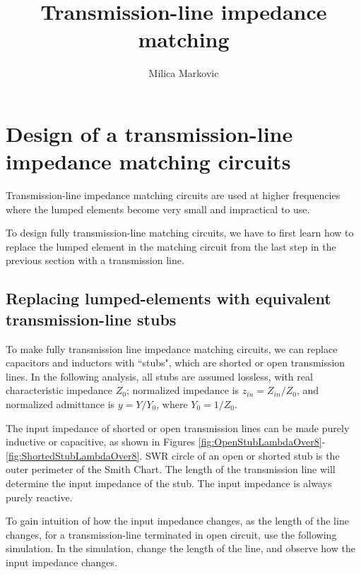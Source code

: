 \documentclass{ximera}
\title{Transmission-line impedance matching}
\author{Milica Markovic}
\begin{document}
  
\begin{abstract}  

\end{abstract}  
\maketitle    



\section{Design of a transmission-line impedance matching circuits}

Transmission-line impedance matching circuits are used at higher frequencies where the lumped elements become very small and impractical to use. 

To design fully transmission-line matching circuits, we have to first learn how to replace the lumped element in the matching circuit from the last step in the previous section with a transmission line. 

\subsection{Replacing lumped-elements with equivalent transmission-line stubs}

To make fully transmission line impedance matching circuits, we can replace capacitors and inductors with ``stubs", which are shorted or open transmission lines. In the following analysis, all stubs are assumed lossless, with real characteristic impedance $Z_0$; normalized impedance is $z_{in}=Z_{in}/Z_0$, and normalized admittance is $y=Y/Y_0$, where $Y_0=1/Z_0$.

The input impedance of shorted or open transmission lines can be made purely inductive or capacitive, as shown in Figures \ref{fig:OpenStubLambdaOver8}-\ref{fig:ShortedStubLambdaOver8}. SWR circle of an open or shorted stub is the outer perimeter of the Smith Chart. The length of the transmission line will determine the input impedance of the stub. The input impedance is always purely reactive. 


To gain intuition of how the input impedance changes, as the length of the line changes, for a transmission-line terminated in open circuit, use the following simulation. In the simulation, change the length of the line, and observe how the input impedance changes.

\begin{center}  
\end{center} 
\end{document}
